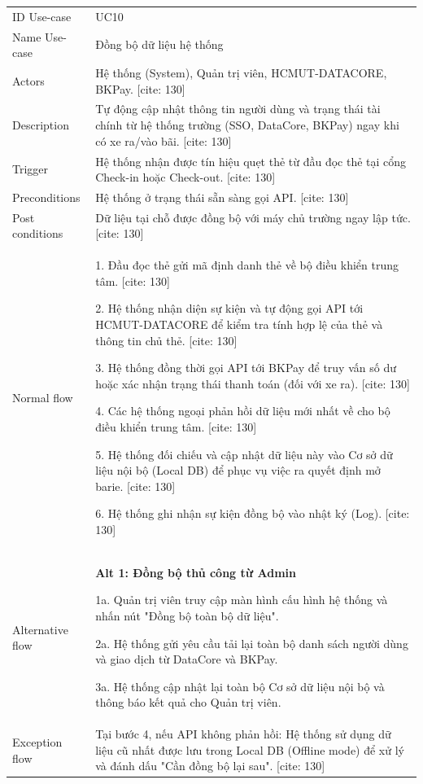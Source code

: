 \begin{center}
    \begin{tabular}{|m{2.5cm}|m{13cm}|}
    \hline
        ID Use-case  & UC10 \\ 
        Name Use-case & Đồng bộ dữ liệu hệ thống \\ 
    \hline
        Actors & Hệ thống (System), Quản trị viên, HCMUT-DATACORE, BKPay. [cite: 130] \\
    \hline
        Description & Tự động cập nhật thông tin người dùng và trạng thái tài chính từ hệ thống trường (SSO, DataCore, BKPay) ngay khi có xe ra/vào bãi. [cite: 130] \\
    \hline
        Trigger & Hệ thống nhận được tín hiệu quẹt thẻ từ đầu đọc thẻ tại cổng Check-in hoặc Check-out. [cite: 130] \\
    \hline
        Preconditions & Hệ thống ở trạng thái sẵn sàng gọi API. [cite: 130] \\
    \hline
        Post conditions & Dữ liệu tại chỗ được đồng bộ với máy chủ trường ngay lập tức. [cite: 130] \\
    \hline
        Normal flow & 
        1. Đầu đọc thẻ gửi mã định danh thẻ về bộ điều khiển trung tâm. [cite: 130]
        
        2. Hệ thống nhận diện sự kiện và tự động gọi API tới HCMUT-DATACORE để kiểm tra tính hợp lệ của thẻ và thông tin chủ thẻ. [cite: 130]
        
        3. Hệ thống đồng thời gọi API tới BKPay để truy vấn số dư hoặc xác nhận trạng thái thanh toán (đối với xe ra). [cite: 130]
        
        4. Các hệ thống ngoại phản hồi dữ liệu mới nhất về cho bộ điều khiển trung tâm. [cite: 130]
        
        5. Hệ thống đối chiếu và cập nhật dữ liệu này vào Cơ sở dữ liệu nội bộ (Local DB) để phục vụ việc ra quyết định mở barie. [cite: 130]
        
        6. Hệ thống ghi nhận sự kiện đồng bộ vào nhật ký (Log). [cite: 130] \\
    \hline
        Alternative flow & 
        \textbf{Alt 1: Đồng bộ thủ công từ Admin}
        
        1a. Quản trị viên truy cập màn hình cấu hình hệ thống và nhấn nút "Đồng bộ toàn bộ dữ liệu".
        
        2a. Hệ thống gửi yêu cầu tải lại toàn bộ danh sách người dùng và giao dịch từ DataCore và BKPay.
        
        3a. Hệ thống cập nhật lại toàn bộ Cơ sở dữ liệu nội bộ và thông báo kết quả cho Quản trị viên. \\ 
    \hline
        Exception flow & 
        Tại bước 4, nếu API không phản hồi: Hệ thống sử dụng dữ liệu cũ nhất được lưu trong Local DB (Offline mode) để xử lý và đánh dấu "Cần đồng bộ lại sau". [cite: 130] \\
    \hline
    \end{tabular}
\end{center}